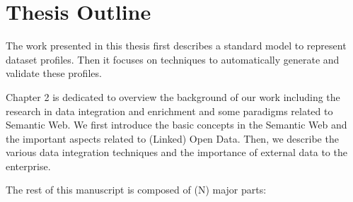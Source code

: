 \section{Thesis Outline} \label{sec:outline}
The work presented in this thesis first describes a standard model to represent dataset profiles. Then it focuses on techniques to automatically generate and validate these profiles.

Chapter 2 is dedicated to overview the background of our work including the research in data integration and enrichment and some paradigms related to Semantic Web. We first introduce the basic concepts in the Semantic Web and the important aspects related to (Linked) Open Data. Then, we describe the various data integration techniques and the importance of external data to the enterprise.

The rest of this manuscript is composed of (N) major parts:

